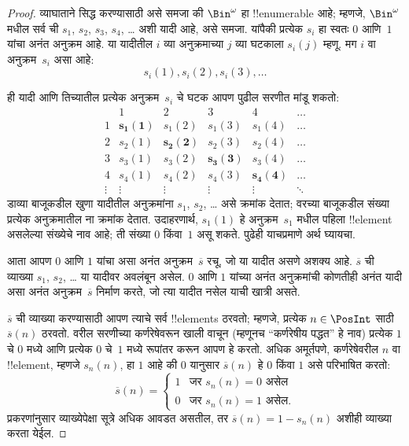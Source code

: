 \documentclass[../../../include/open-logic-section]{subfiles}
\begin{document}
\begin{proof}
व्याघाताने सिद्ध करण्यासाठी असे समजा की $\Bin^\omega$ हा !!{enumerable} आहे; म्हणजे,
$\Bin^\omega$ मधील सर्व ची $s_{1}$, $s_{2}$, $s_{3}$,
$s_{4}$, \dots{} अशी यादी आहे, असे समजा. यांपैकी प्रत्येक $s_i$ हा
स्वतः $0$ आणि~$1$ यांचा अनंत अनुक्रम आहे. या यादीतील $i$ व्या अनुक्रमाच्या
$j$ व्या घटकाला $s_i(j)$ म्हणू. मग $i$ वा अनुक्रम~$s_i$ असा आहे:
\[
s_i(1), s_i(2), s_i(3), \dots
\]

ही यादी आणि तिच्यातील प्रत्येक अनुक्रम~$s_i$ चे घटक आपण पुढील सरणीत
मांडू शकतो:
\[
\begin{array}{c|c|c|c|c|c}
& 1 & 2 & 3 & 4 & \dots \\\hline
1 & \mathbf{s_{1}(1)} & s_{1}(2) & s_{1}(3) & s_1(4) & \dots \\\hline
2 & s_{2}(1)& \mathbf{s_{2}(2)} & s_2(3) & s_2(4) & \dots \\\hline
3 & s_{3}(1)& s_{3}(2) & \mathbf{s_3(3)} & s_3(4) & \dots \\\hline
4 & s_{4}(1)& s_{4}(2) & s_4(3) & \mathbf{s_4(4)} & \dots \\\hline
\vdots & \vdots & \vdots & \vdots & \vdots & \mathbf{\ddots}
\end{array}
\]
डाव्या बाजूकडील खुणा यादीतील अनुक्रमांना $s_1$, $s_2$, \dots{} असे
क्रमांक देतात; वरच्या बाजूकडील संख्या प्रत्येक अनुक्रमातील ना क्रमांक देतात. उदाहरणार्थ, $s_{1}(1)$ हे अनुक्रम~$s_{1}$ मधील
पहिला !!{element} असलेल्या संख्येचे नाव आहे; ती संख्या $0$ किंवा~$1$
असू शकते. पुढेही याचप्रमाणे अर्थ घ्यायचा.

आता आपण $0$ आणि $1$ यांचा असा अनंत अनुक्रम~$\overline{s}$ रचू, जो
या यादीत असणे अशक्य आहे. $\overline{s}$ ची व्याख्या $s_1$, $s_2$,
\dots{} या यादीवर अवलंबून असेल. $0$ आणि $1$ यांच्या अनंत अनुक्रमांची
कोणतीही अनंत यादी असा अनंत अनुक्रम~$\overline{s}$ निर्माण करते, जो
त्या यादीत नसेल याची खात्री असते.

$\overline{s}$ ची व्याख्या करण्यासाठी आपण त्याचे सर्व !!{element}s
ठरवतो; म्हणजे, प्रत्येक $n \in \PosInt$ साठी $\overline{s}(n)$
ठरवतो. वरील सरणीच्या कर्णरेषेवरून खाली वाचून (म्हणूनच ``कर्णरेषीय
पद्धत'' हे नाव) प्रत्येक $1$ चे $0$ मध्ये आणि प्रत्येक $0$ चे~$1$
मध्ये रूपांतर करून आपण हे करतो. अधिक अमूर्तपणे, कर्णरेषेवरील $n$ वा
!!{element}, म्हणजे $s_n(n)$, हा $1$ आहे की $0$ यानुसार
$\overline{s}(n)$ हे $0$ किंवा $1$ असे परिभाषित करतो:
\[
\overline{s}(n) =
\begin{cases}
1 & \text{जर $s_{n}(n) = 0$ असेल}\\
0 & \text{जर $s_{n}(n) = 1$ असेल}.
\end{cases}
\]
प्रकरणांनुसार व्याख्येपेक्षा सूत्रे अधिक आवडत असतील, तर
$\overline{s}(n) = 1 - s_n(n)$ अशीही व्याख्या करता येईल.


\end{proof}
\end{document}
